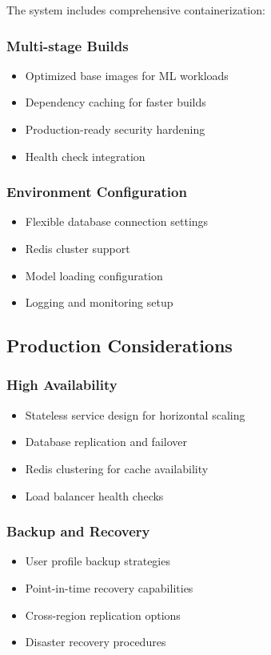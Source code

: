 \documentclass[12pt,a4paper]{article}
\begin{document}
The system includes comprehensive containerization:

\subsubsection{Multi-stage Builds}
\begin{itemize}
    \item Optimized base images for ML workloads
    \item Dependency caching for faster builds
    \item Production-ready security hardening
    \item Health check integration
\end{itemize}

\subsubsection{Environment Configuration}
\begin{itemize}
    \item Flexible database connection settings
    \item Redis cluster support
    \item Model loading configuration
    \item Logging and monitoring setup
\end{itemize}

\subsection{Production Considerations}

\subsubsection{High Availability}
\begin{itemize}
    \item Stateless service design for horizontal scaling
    \item Database replication and failover
    \item Redis clustering for cache availability
    \item Load balancer health checks
\end{itemize}

\subsubsection{Backup and Recovery}
\begin{itemize}
    \item User profile backup strategies
    \item Point-in-time recovery capabilities
    \item Cross-region replication options
    \item Disaster recovery procedures
\end{itemize}
\end{document}
